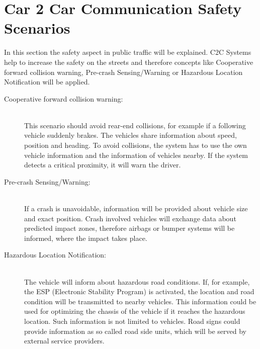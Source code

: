 \section{Car 2 Car Communication Safety Scenarios}
\label{sec:C2CSafetyScenarios}
In this section the safety aspect in public traffic will be explained. C2C Systems help to increase the safety on the streets and therefore concepts like Cooperative forward collision warning, Pre-crash Sensing/Warning or Hazardous Location Notification will be applied.\\
\begin{description}
  \item[Cooperative forward collision warning:] \hfill \\ This scenario should avoid rear-end collisions, for example if a following vehicle suddenly brakes. The vehicles share information about speed, position and heading. To avoid collisions, the system has to use the own vehicle information and the information of vehicles nearby. If the system detects a critical proximity, it will warn the driver.\cite{c2cmanifesto}
  \item[Pre-crash Sensing/Warning:] \hfill \\ If a crash is unavoidable, information will be provided about vehicle size and exact position. Crash involved vehicles will exchange data about predicted impact zones, therefore airbags or bumper systems will be informed, where the impact takes place.\cite{c2cmanifesto}
  \item[Hazardous Location Notification:] \hfill \\ The vehicle will inform about hazardous road conditions. If, for example, the ESP (Electronic Stability Program) is activated, the location and road condition will be transmitted to nearby vehicles. This information could be used for optimizing the chassis of the vehicle if it reaches the hazardous location. Such information is not limited to vehicles. Road signs could provide information as so called road side units, which will be served by external service providers.\cite{c2cmanifesto}
\end{description}	

